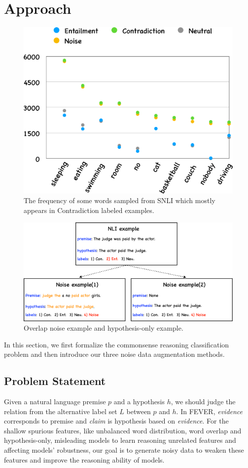 \section{Approach}
\label{sec:approach}

\begin{figure}[th!]
	\centering
	\includegraphics[width=0.5\columnwidth]{figures/noise_balance.eps}
	\caption{The frequency of some words sampled from SNLI which mostly appears in Contradiction labeled examples.
	}
\label{fig:noise_balance}
\end{figure}

\begin{figure}[th!]
	\centering
	\includegraphics[width=0.9\columnwidth]{figures/noise.eps}
	\caption{Overlap noise example and hypothesis-only example.}
\label{fig:noise2and3}
\end{figure}

In this section, we first formalize the commonsense reasoning classification problem
 and then introduce our three noise data augmentation methods.
 
\subsection{Problem Statement}
\label{sec:problem_statement}
Given a natural language
premise $p$ and a hypothesis $h$, we should judge the 
relation  from the alternative label set $L$ between $p$ and $h$. 
In FEVER, \textit{evidence} corresponds to premise and \textit{claim} 
is hypothesis based on \textit{evidence}. For the shallow spurious features, like 
unbalanced word distribution, word overlap and hypothesis-only, misleading models to
learn reasoning unrelated features and affecting models' robustness, 
our goal is to generate noisy data to weaken these features and improve 
the reasoning ability of models.


